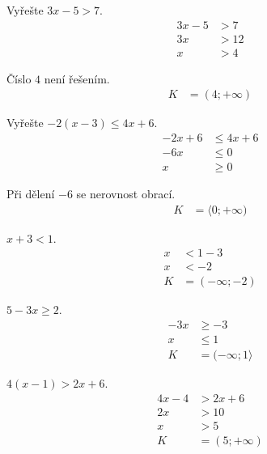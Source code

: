 \documentclass[11pt,a4paper]{article}
\begin{document}
\begin{prikladReseniBox}[title={Příklad 2}]
Vyřešte $3x-5>7$.
\tcblower
\[
\begin{aligned}
3x-5&>7 \\
 3x&>12 \\
 x&>4
\end{aligned}
\]

Číslo $4$ není řešením.
\[
\begin{aligned}
K &= (4;+\infty)
\end{aligned}
\]
\end{prikladReseniBox}
\begin{prikladReseniBox}[title={Příklad 3}]
Vyřešte $-2(x-3)\le4x+6$.
\tcblower
\[
\begin{aligned}
-2x+6&\le4x+6 \\
 -6x&\le0 \\
 x&\ge0
\end{aligned}
\]

Při dělení $-6$ se nerovnost obrací.
\[
\begin{aligned}
K &= \langle0;+\infty)
\end{aligned}
\]
\end{prikladReseniBox}
\begin{zadaniReseniBox}[title={Samostatná práce 1}]
$x+3<1$.
\tcblower
\[
\begin{aligned}
x&<1-3 \\
 x&<-2 \\[2mm]
K &= (-\infty;-2)
\end{aligned}
\]
\end{zadaniReseniBox}
\begin{zadaniReseniBox}[title={Samostatná práce 2}]
$5-3x\ge2$.
\tcblower
\[
\begin{aligned}
-3x&\ge-3 \\
 x&\le1 \\[2mm]
K &= (-\infty;1\rangle
\end{aligned}
\]
\end{zadaniReseniBox}
\begin{zadaniReseniBox}[title={Samostatná práce 3}]
$4(x-1)>2x+6$.
\tcblower
\[
\begin{aligned}
4x-4&>2x+6 \\
 2x&>10 \\
 x&>5 \\[2mm]
K &= (5;+\infty)
\end{aligned}
\]
\end{zadaniReseniBox}
\end{document}

